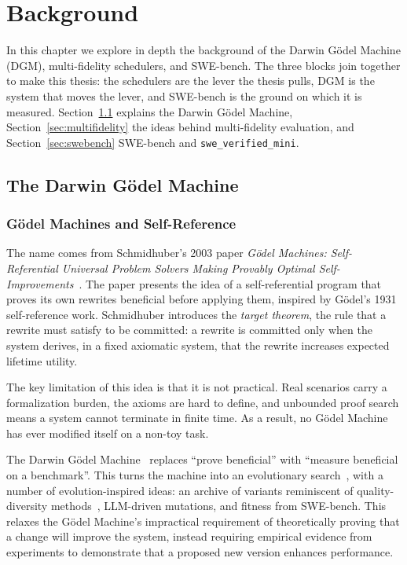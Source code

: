 \chapter{Background}
\label{chap:background}

In this chapter we explore in depth the background of the Darwin
G{\"o}del Machine (DGM), multi-fidelity schedulers, and SWE-bench. The
three blocks join together to make this thesis: the schedulers are the
lever the thesis pulls, DGM is the system that moves the lever, and
SWE-bench is the ground on which it is measured.
Section~\ref{sec:dgm} explains the Darwin G{\"o}del Machine,
Section~\ref{sec:multifidelity} the ideas behind multi-fidelity
evaluation, and Section~\ref{sec:swebench} SWE-bench and
\texttt{swe\_verified\_mini}.

\section{The Darwin G{\"o}del Machine}
\label{sec:dgm}

\subsection{G{\"o}del Machines and Self-Reference}

The name comes from Schmidhuber's 2003 paper \emph{G{\"o}del Machines:
Self-Referential Universal Problem Solvers Making Provably Optimal
Self-Improvements}~\cite{Schmidhuber:03}. The paper presents the idea
of a self-referential program that proves its own rewrites beneficial
before applying them, inspired by G{\"o}del's 1931 self-reference work.
Schmidhuber introduces the \emph{target theorem}, the rule that a
rewrite must satisfy to be committed: a rewrite is committed only when
the system derives, in a fixed axiomatic system, that the rewrite
increases expected lifetime utility.

The key limitation of this idea is that it is not practical. Real
scenarios carry a formalization burden, the axioms are hard to define,
and unbounded proof search means a system cannot terminate in finite
time. As a result, no G{\"o}del Machine has ever modified itself on a
non-toy task.

The Darwin G{\"o}del Machine~\cite{Sakana:25} replaces ``prove
beneficial'' with ``measure beneficial on a benchmark''. This turns
the machine into an evolutionary search~\cite{Holland:75}, with a
number of evolution-inspired ideas: an archive of variants
reminiscent of quality-diversity methods~\cite{Mouret:15}, LLM-driven
mutations, and fitness from SWE-bench. This relaxes the G{\"o}del Machine's impractical requirement
of theoretically proving that a change will improve the system, instead
requiring empirical evidence from experiments to demonstrate that a
proposed new version enhances performance.

